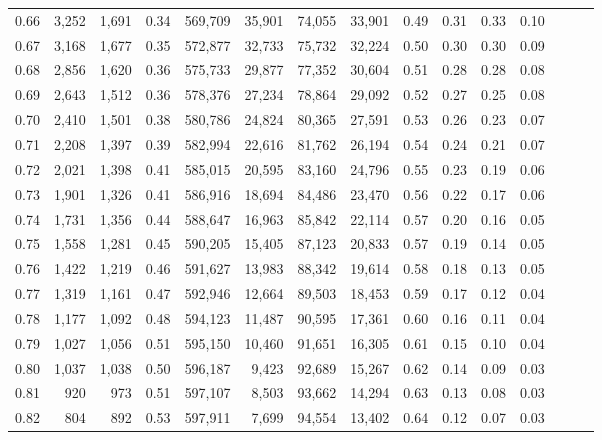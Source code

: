 \begin{tabular}{rrrrrrrrrrrrrrr}
0.66 &   3,252 &  1,691 &  0.34 &  569,709 &   35,901 &   74,055 &   33,901 &  0.49 &  0.31 &  0.33 &      0.10 \\
0.67 &   3,168 &  1,677 &  0.35 &  572,877 &   32,733 &   75,732 &   32,224 &  0.50 &  0.30 &  0.30 &      0.09 \\
0.68 &   2,856 &  1,620 &  0.36 &  575,733 &   29,877 &   77,352 &   30,604 &  0.51 &  0.28 &  0.28 &      0.08 \\
0.69 &   2,643 &  1,512 &  0.36 &  578,376 &   27,234 &   78,864 &   29,092 &  0.52 &  0.27 &  0.25 &      0.08 \\
0.70 &   2,410 &  1,501 &  0.38 &  580,786 &   24,824 &   80,365 &   27,591 &  0.53 &  0.26 &  0.23 &      0.07 \\
0.71 &   2,208 &  1,397 &  0.39 &  582,994 &   22,616 &   81,762 &   26,194 &  0.54 &  0.24 &  0.21 &      0.07 \\
0.72 &   2,021 &  1,398 &  0.41 &  585,015 &   20,595 &   83,160 &   24,796 &  0.55 &  0.23 &  0.19 &      0.06 \\
0.73 &   1,901 &  1,326 &  0.41 &  586,916 &   18,694 &   84,486 &   23,470 &  0.56 &  0.22 &  0.17 &      0.06 \\
0.74 &   1,731 &  1,356 &  0.44 &  588,647 &   16,963 &   85,842 &   22,114 &  0.57 &  0.20 &  0.16 &      0.05 \\
0.75 &   1,558 &  1,281 &  0.45 &  590,205 &   15,405 &   87,123 &   20,833 &  0.57 &  0.19 &  0.14 &      0.05 \\
0.76 &   1,422 &  1,219 &  0.46 &  591,627 &   13,983 &   88,342 &   19,614 &  0.58 &  0.18 &  0.13 &      0.05 \\
0.77 &   1,319 &  1,161 &  0.47 &  592,946 &   12,664 &   89,503 &   18,453 &  0.59 &  0.17 &  0.12 &      0.04 \\
0.78 &   1,177 &  1,092 &  0.48 &  594,123 &   11,487 &   90,595 &   17,361 &  0.60 &  0.16 &  0.11 &      0.04 \\
0.79 &   1,027 &  1,056 &  0.51 &  595,150 &   10,460 &   91,651 &   16,305 &  0.61 &  0.15 &  0.10 &      0.04 \\
0.80 &   1,037 &  1,038 &  0.50 &  596,187 &    9,423 &   92,689 &   15,267 &  0.62 &  0.14 &  0.09 &      0.03 \\
0.81 &     920 &    973 &  0.51 &  597,107 &    8,503 &   93,662 &   14,294 &  0.63 &  0.13 &  0.08 &      0.03 \\
0.82 &     804 &    892 &  0.53 &  597,911 &    7,699 &   94,554 &   13,402 &  0.64 &  0.12 &  0.07 &      0.03 \\

\end{tabular}
